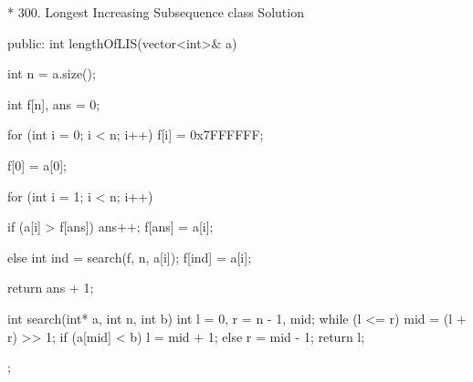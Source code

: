 * 300. Longest Increasing Subsequence
		class Solution {
		public:
			int lengthOfLIS(vector<int>& a) {
				int n = a.size();

				int f[n], ans = 0;

				for (int i = 0; i < n; i++) {
					f[i] = 0x7FFFFFF;
				}

				f[0] = a[0];

				for (int i = 1; i < n; i++) {
					if (a[i] > f[ans]) {
						ans++;
						f[ans] = a[i];
					}

					else {
						int ind = search(f, n, a[i]);
						f[ind] = a[i];
					}
				}
				return ans + 1;
			}

			int search(int* a, int n, int b) {
				int l = 0, r = n - 1, mid;
				while (l <= r) {
					mid = (l + r) >> 1;
					if (a[mid] < b) {
						l = mid + 1;
					}
					else {
						r = mid - 1;
					}
				}
				return l;
			}
		};
